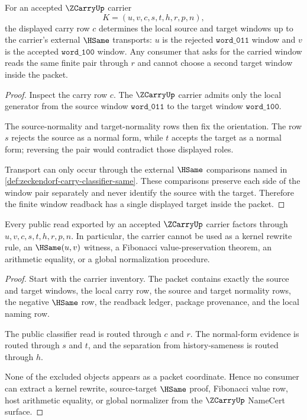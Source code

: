 \begin{theorem}
\label{thm:zeckendorf-carry-classifier-window-determinacy}
For an accepted $\ZCarryUp$ carrier
$$
K=(u,v,c,s,t,h,r,p,n),
$$
the displayed carry row $c$ determines the local source and target windows up to the carrier's external $\HSame$ transports: $u$ is the rejected $\mathtt{word\_011}$ window and $v$ is the accepted $\mathtt{word\_100}$ window. Any consumer that asks for the carried window reads the same finite pair through $r$ and cannot choose a second target window inside the packet.
\end{theorem}
\begin{proof}
Inspect the carry row $c$. The $\ZCarryUp$ carrier admits only the local generator from the source window $\mathtt{word\_011}$ to the target window $\mathtt{word\_100}$.

The source-normality and target-normality rows then fix the orientation. The row $s$ rejects the source as a normal form, while $t$ accepts the target as a normal form; reversing the pair would contradict those displayed roles.

Transport can only occur through the external $\HSame$ comparisons named in \autoref{def:zeckendorf-carry-classifier-same}. These comparisons preserve each side of the window pair separately and never identify the source with the target. Therefore the finite window readback has a single displayed target inside the packet.
\end{proof}

\begin{theorem}
\label{thm:zeckendorf-carry-classifier-nonescape-boundary}
Every public read exported by an accepted $\ZCarryUp$ carrier factors through $u,v,c,s,t,h,r,p,n$. In particular, the carrier cannot be used as a kernel rewrite rule, an $\HSame(u,v)$ witness, a Fibonacci value-preservation theorem, an arithmetic equality, or a global normalization procedure.
\end{theorem}
\begin{proof}
Start with the carrier inventory. The packet contains exactly the source and target windows, the local carry row, the source and target normality rows, the negative $\HSame$ row, the readback ledger, package provenance, and the local naming row.

The public classifier read is routed through $c$ and $r$. The normal-form evidence is routed through $s$ and $t$, and the separation from history-sameness is routed through $h$.

None of the excluded objects appears as a packet coordinate. Hence no consumer can extract a kernel rewrite, source-target $\HSame$ proof, Fibonacci value row, host arithmetic equality, or global normalizer from the $\ZCarryUp$ NameCert surface.
\end{proof}

